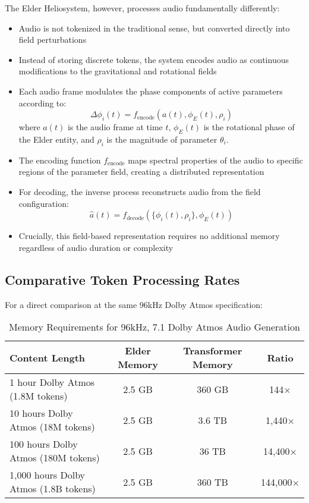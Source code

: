 The Elder Heliosystem, however, processes audio fundamentally differently:
\begin{itemize}
    \item Audio is not tokenized in the traditional sense, but converted directly into field perturbations
    \item Instead of storing discrete tokens, the system encodes audio as continuous modifications to the gravitational and rotational fields
    \item Each audio frame modulates the phase components of active parameters according to:
    \begin{equation}
    \Delta\phi_i(t) = f_{\text{encode}}(a(t), \phi_E(t), \rho_i)
    \end{equation}
    where $a(t)$ is the audio frame at time $t$, $\phi_E(t)$ is the rotational phase of the Elder entity, and $\rho_i$ is the magnitude of parameter $\theta_i$.
    
    \item The encoding function $f_{\text{encode}}$ maps spectral properties of the audio to specific regions of the parameter field, creating a distributed representation
    
    \item For decoding, the inverse process reconstructs audio from the field configuration:
    \begin{equation}
    \hat{a}(t) = f_{\text{decode}}(\{\phi_i(t), \rho_i\}, \phi_E(t))
    \end{equation}
    
    \item Crucially, this field-based representation requires no additional memory regardless of audio duration or complexity
\end{itemize}

\subsection{Comparative Token Processing Rates}

For a direct comparison at the same 96kHz Dolby Atmos specification:

\begin{table}[h]
\centering
\begin{tabular}{|l|c|c|c|}
\hline
\textbf{Content Length} & \textbf{Elder Memory} & \textbf{Transformer Memory} & \textbf{Ratio} \\
\hline
1 hour Dolby Atmos (1.8M tokens) & 2.5 GB & 360 GB & 144× \\
10 hours Dolby Atmos (18M tokens) & 2.5 GB & 3.6 TB & 1,440× \\
100 hours Dolby Atmos (180M tokens) & 2.5 GB & 36 TB & 14,400× \\
1,000 hours Dolby Atmos (1.8B tokens) & 2.5 GB & 360 TB & 144,000× \\
\hline
\end{tabular}
\caption{Memory Requirements for 96kHz, 7.1 Dolby Atmos Audio Generation}
\end{table}

